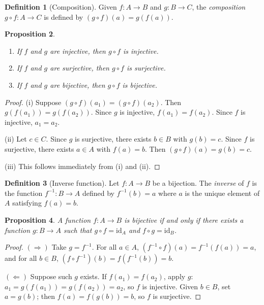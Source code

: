 \documentclass[12pt,a4paper,openany]{book}
\theoremstyle{definition}
\newtheorem{definition}{Definition}[chapter]
\theoremstyle{plain}
\newtheorem{proposition}[definition]{Proposition}
\theoremstyle{remark}
\begin{document}
\begin{definition}[Composition]\label{def:composition}
Given $f\colon A \to B$ and $g\colon B \to C$, the \emph{composition}
$g \circ f \colon A \to C$ is defined by $(g \circ f)(a) = g(f(a))$.
\end{definition}

\begin{proposition}\label{prop:composition-preserves}
\begin{enumerate}[label=(\roman*)]
  \item If $f$ and $g$ are injective, then $g \circ f$ is injective.
  \item If $f$ and $g$ are surjective, then $g \circ f$ is surjective.
  \item If $f$ and $g$ are bijective, then $g \circ f$ is bijective.
\end{enumerate}
\end{proposition}

\begin{proof}
(i)\; Suppose $(g \circ f)(a_1) = (g \circ f)(a_2)$. Then
$g(f(a_1)) = g(f(a_2))$. Since $g$ is injective, $f(a_1) = f(a_2)$.
Since $f$ is injective, $a_1 = a_2$.

(ii)\; Let $c \in C$. Since $g$ is surjective, there exists $b \in B$ with
$g(b) = c$. Since $f$ is surjective, there exists $a \in A$ with $f(a) = b$.
Then $(g \circ f)(a) = g(b) = c$.

(iii)\; This follows immediately from (i) and (ii).
\end{proof}

\begin{definition}[Inverse function]\label{def:inverse-function}
Let $f\colon A \to B$ be a bijection. The \emph{inverse} of $f$ is the
function $f^{-1}\colon B \to A$ defined by $f^{-1}(b) = a$ where $a$ is
the unique element of $A$ satisfying $f(a) = b$.
\end{definition}

\begin{proposition}\label{prop:inverse-bijection}
A function $f\colon A \to B$ is bijective if and only if there exists a
function $g\colon B \to A$ such that $g \circ f = \mathrm{id}_A$ and
$f \circ g = \mathrm{id}_B$.
\end{proposition}

\begin{proof}
$(\Rightarrow)$\; Take $g = f^{-1}$. For all $a \in A$,
$(f^{-1} \circ f)(a) = f^{-1}(f(a)) = a$, and for all $b \in B$,
$(f \circ f^{-1})(b) = f(f^{-1}(b)) = b$.

$(\Leftarrow)$\; Suppose such $g$ exists. If $f(a_1) = f(a_2)$, apply $g$:
$a_1 = g(f(a_1)) = g(f(a_2)) = a_2$, so $f$ is injective. Given $b \in B$,
set $a = g(b)$; then $f(a) = f(g(b)) = b$, so $f$ is surjective.
\end{proof}
\end{document}

